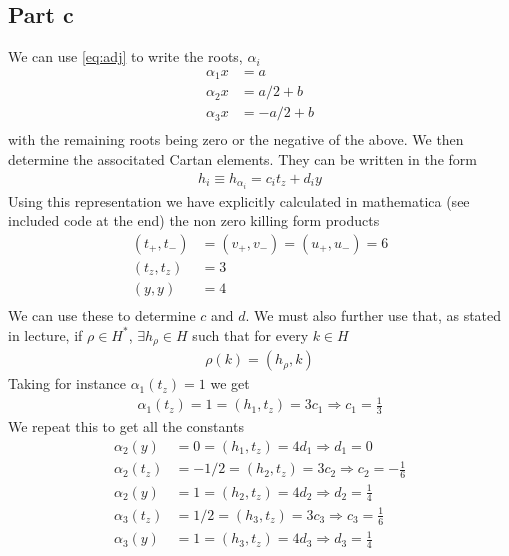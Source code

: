 \documentclass[a4paper,12pt]{article}
\begin{document}
\subsection*{Part c}
We can use \eqref{eq:adj} to write the roots, $\alpha_i$
\begin{equation} \label{eq: roots}
	\begin{aligned}
		\alpha_{1}x&=a\\
		\alpha_{2}x&=a/2+b\\
		\alpha_{3}x&=-a/2+b\\
	\end{aligned}
\end{equation}
with the remaining roots being zero or the negative of the above. We then determine the associtated Cartan elements. They can be written in the form
\begin{equation}
	\begin{aligned}
		h_i\equiv h_{\alpha_i}=c_it_z+d_iy
	\end{aligned}
\end{equation}
Using this representation we have explicitly calculated in mathematica (see included code at the end) the non zero killing form products
\begin{equation}
	\begin{aligned}
		(t_+,t_-)&=(v_+,v_-)=(u_+,u_-)=6\\
		(t_z,t_z)&=3\\
	     (y,y)&=4\\	
	\end{aligned}
\end{equation}
We can use these to determine $c$ and $d$. We must also further use that, as stated in lecture, if $\rho\in H^*$, $\exists h_\rho \in H$ such that for every $k\in H$
\begin{equation}
	\begin{aligned}
		\rho(k)=(h_\rho,k)
	\end{aligned}
\end{equation} 
Taking for instance $\alpha_1(t_z)=1$ we get
\begin{equation}
	\begin{aligned}
		\alpha_1(t_z)=1=(h_1,t_z)=3c_1\Rightarrow c_1=\frac{1}{3}
	\end{aligned}
\end{equation}
We repeat this to get all the constants
\begin{equation}
	\begin{aligned}
		\alpha_2(y)&=0=(h_1,t_z)=4d_1\Rightarrow d_1=0\\
		\alpha_2(t_z)&=-1/2=(h_2,t_z)=3c_2\Rightarrow c_2=-\frac{1}{6}\\
		\alpha_2(y)&=1=(h_2,t_z)=4d_2\Rightarrow d_2=\frac{1}{4}\\
			\alpha_3(t_z)&=1/2=(h_3,t_z)=3c_3\Rightarrow c_3=\frac{1}{6}\\
		\alpha_3(y)&=1=(h_3,t_z)=4d_3\Rightarrow d_3=\frac{1}{4}\\
	\end{aligned}
\end{equation}
\end{document}
